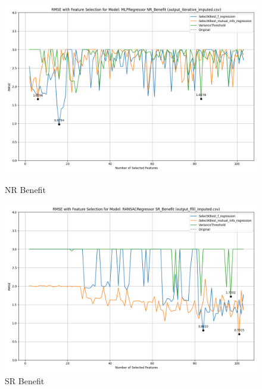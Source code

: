 \begin{figure}[H]
    \centering
    \begin{minipage}{0.45\textwidth}
        \centering
        \includegraphics[width=\linewidth]{reg_section_all/images_reg_featred_graphs/feature_selection_NR_Benefit.png}
        \caption{NR Benefit}
        \label{fig:nr_ben_reg_featred}
    \end{minipage}\hfill
    \begin{minipage}{0.45\textwidth}
        \centering
        \includegraphics[width=\linewidth]{reg_section_all/images_reg_featred_graphs/feature_selection_SR_Benefit.png}
        \caption{SR Benefit}
        \label{fig:sr_ben_reg_featred}
    \end{minipage}
\end{figure}

